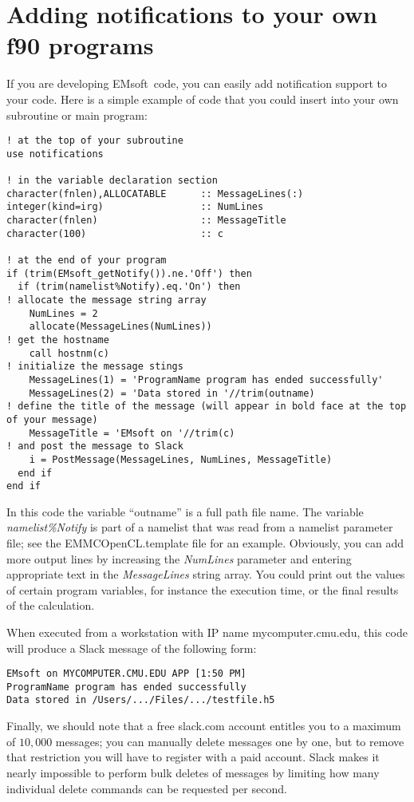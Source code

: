\documentclass[DIV=calc, paper=letter, fontsize=11pt]{scrartcl}	 %
\newcommand{\ctp}{\textsf{EMsoft}}
\begin{document}
\section{Adding notifications to your own f90 programs}
If you are developing \ctp\ code, you can easily add notification support to your code.  Here is a simple example of code that you could insert into your own subroutine or main program:
\begin{verbatim}
! at the top of your subroutine
use notifications

! in the variable declaration section
character(fnlen),ALLOCATABLE      :: MessageLines(:)
integer(kind=irg)                 :: NumLines
character(fnlen)                  :: MessageTitle
character(100)                    :: c

! at the end of your program
if (trim(EMsoft_getNotify()).ne.'Off') then
  if (trim(namelist%Notify).eq.'On') then 
! allocate the message string array  
    NumLines = 2
    allocate(MessageLines(NumLines))
! get the hostname
    call hostnm(c)
! initialize the message stings 
    MessageLines(1) = 'ProgramName program has ended successfully'
    MessageLines(2) = 'Data stored in '//trim(outname)
! define the title of the message (will appear in bold face at the top of your message)
    MessageTitle = 'EMsoft on '//trim(c)
! and post the message to Slack    
    i = PostMessage(MessageLines, NumLines, MessageTitle)
  end if
end if
\end{verbatim}
In this code the variable ``outname'' is a full path file name.  The variable \textit{namelist\%Notify} is part of a namelist that was read
from a namelist parameter file;  see the \textsf{EMMCOpenCL.template} file for an example.  Obviously, you can add more output lines
by increasing the \textit{NumLines} parameter and entering appropriate text in the \textit{MessageLines} string array.  You could print out the 
values of certain program variables, for instance the execution time, or the final results of the calculation.

When executed from a workstation with IP name \textsf{mycomputer.cmu.edu}, this code will produce a Slack message of the following form:
\begin{verbatim}
EMsoft on MYCOMPUTER.CMU.EDU APP [1:50 PM] 
ProgramName program has ended successfully
Data stored in /Users/.../Files/.../testfile.h5
\end{verbatim}

Finally, we should note that a free slack.com account entitles you to a maximum of $10,000$ messages; you can manually delete messages one by one, but
to remove that restriction you will have to register with a paid account.  Slack makes it nearly impossible to perform bulk deletes of messages by limiting how 
many individual delete commands can be requested per second.
\end{document}
